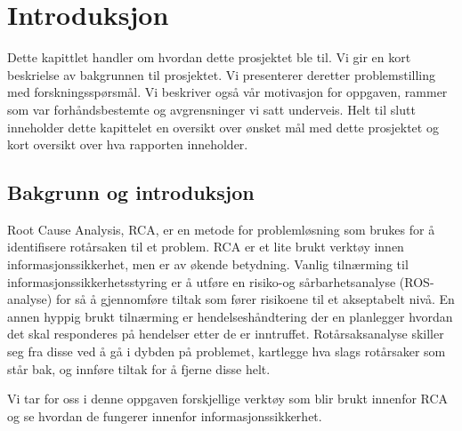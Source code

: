 \chapter{Introduksjon}
\label{kap:introduksjon}
Dette kapittlet handler om hvordan dette prosjektet ble til. Vi gir en kort beskrielse av bakgrunnen til prosjektet. Vi presenterer deretter problemstilling med forskningsspørsmål. Vi beskriver også vår motivasjon for oppgaven, rammer som var forhåndsbestemte og avgrensninger vi satt underveis. Helt til slutt inneholder dette kapittelet en oversikt over ønsket mål med dette prosjektet og kort oversikt over hva rapporten inneholder.


\section{Bakgrunn og introduksjon}
\label{sec:bakgrunn}
Root Cause Analysis, RCA, er en metode for problemløsning som brukes for å identifisere rotårsaken til et problem. RCA er et lite brukt verktøy innen informasjonssikkerhet, men er av økende betydning. Vanlig tilnærming til informasjonssikkerhetsstyring er å utføre en risiko-og sårbarhetsanalyse (ROS-analyse) for så å gjennomføre tiltak som fører risikoene til et akseptabelt nivå. En annen hyppig brukt tilnærming er hendelseshåndtering der en planlegger hvordan det skal responderes på hendelser etter de er inntruffet. Rotårsaksanalyse skiller seg fra disse ved å gå i dybden på problemet, kartlegge hva slags rotårsaker som står bak, og innføre tiltak for å fjerne disse helt. 

Vi tar for oss i denne oppgaven forskjellige verktøy som blir brukt innenfor RCA og se hvordan de fungerer innenfor informasjonssikkerhet. 